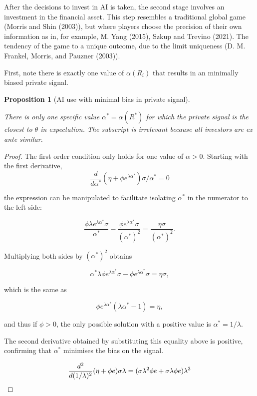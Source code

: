 \documentclass[
]{article}
\theoremstyle{definition}
\theoremstyle{plain}
\newtheorem{proposition}{Proposition}[section]
\theoremstyle{remark}
\begin{document}
After the decisions to invest in AI is taken, the second stage involves
an investment in the financial asset. This step resembles a traditional
global game (Morris and Shin (2003)), but where players choose the
precision of their own information as in, for example, M. Yang (2015),
Szkup and Trevino (2021). The tendency of the game to a unique outcome,
due to the limit uniqueness (D. M. Frankel, Morris, and Pauzner (2003)).

First, note there is exactly one value of \(\alpha(R_i)\) that results
in an minimally biased private signal.

\begin{proposition}[AI use with minimal bias in private
signal]\protect\hypertarget{prp-alphainvestlowestbias}{}\label{prp-alphainvestlowestbias}

There is only one specific value \(\alpha^* = \alpha(R^*)\) for which
the private signal is the closest to \(\theta\) in expectation. The
subscript is irrelevant because all investors are ex ante similar.

\end{proposition}

\begin{proof}
The first order condition only holds for one value of \(\alpha > 0\).
Starting with the first derivative, \[
\frac{d}{d \alpha^*} (\eta + \phi e^{\lambda \alpha^*}) \sigma / \alpha^* = 0
\]

the expression can be manipulated to facilitate isolating \(\alpha^*\)
in the numerator to the left side:

\[
\frac{\phi \lambda e^{\lambda \alpha^*} \sigma}{\alpha^*} - \frac{\phi e^{\lambda \alpha^*}\sigma}{(\alpha^*)^2} = \frac{\eta \sigma}{(\alpha^*)^2}.
\]

Multiplying both sides by \((\alpha^*)^2\) obtains

\[
\alpha^* \lambda \phi e^{\lambda \alpha^*} \sigma - \phi e^{\lambda \alpha^*}\sigma = \eta \sigma,
\]

which is the same as

\[
\phi e^{\lambda \alpha^*} (\lambda \alpha^* - 1)= \eta,
\]

and thus if \(\phi > 0\), the only possible solution with a positive
value is \(\alpha^* = 1/\lambda\).

The second derivative obtained by substituting this equality above is
positive, confirming that \(\alpha^*\) minimises the bias on the signal.

\[
\frac{d^2}{d (1/\lambda)^2} (\eta + \phi e) \sigma \lambda = (\sigma \lambda^2 \phi e + \sigma \lambda \phi e)\lambda^3 \\
\]
\end{proof}
\end{document}

